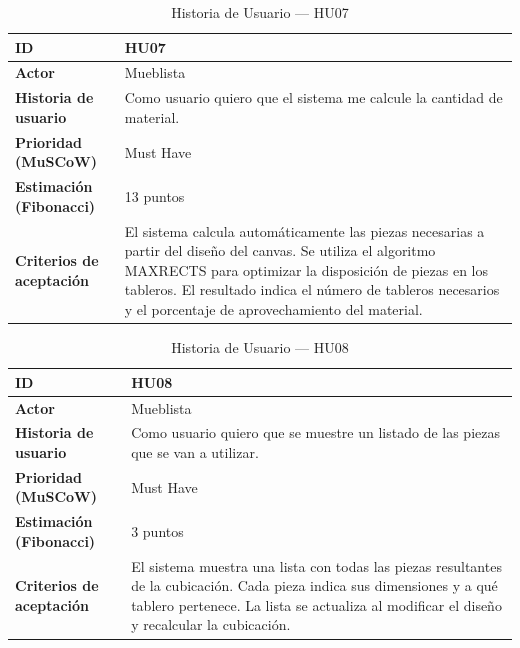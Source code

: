﻿\documentclass{iccmemoria}
\begin{document}
\begin{table}[H]
\centering
\caption{Historia de Usuario — HU07}
\begin{tabular}{|p{4.5cm}|p{9.5cm}|}
\hline
\textbf{ID} & HU07 \\
\hline
\textbf{Actor} & Mueblista \\
\hline
\textbf{Historia de usuario} & Como usuario quiero que el sistema me calcule la cantidad de material. \\
\hline
\textbf{Prioridad (MuSCoW)} & Must Have \\
\hline
\textbf{Estimación (Fibonacci)} & 13 puntos \\
\hline
\textbf{Criterios de aceptación} & El sistema calcula automáticamente las piezas necesarias a partir del diseño del canvas.\newline
Se utiliza el algoritmo MAXRECTS para optimizar la disposición de piezas en los tableros.\newline
El resultado indica el número de tableros necesarios y el porcentaje de aprovechamiento del material. \\
\hline
\end{tabular}
\end{table}

\begin{table}[H]
\centering
\caption{Historia de Usuario — HU08}
\begin{tabular}{|p{4.5cm}|p{9.5cm}|}
\hline
\textbf{ID} & HU08 \\
\hline
\textbf{Actor} & Mueblista \\
\hline
\textbf{Historia de usuario} & Como usuario quiero que se muestre un listado de las piezas que se van a utilizar. \\
\hline
\textbf{Prioridad (MuSCoW)} & Must Have \\
\hline
\textbf{Estimación (Fibonacci)} & 3 puntos \\
\hline
\textbf{Criterios de aceptación} & El sistema muestra una lista con todas las piezas resultantes de la cubicación.\newline
Cada pieza indica sus dimensiones y a qué tablero pertenece.\newline
La lista se actualiza al modificar el diseño y recalcular la cubicación. \\
\hline
\end{tabular}
\end{table}
\end{document}
